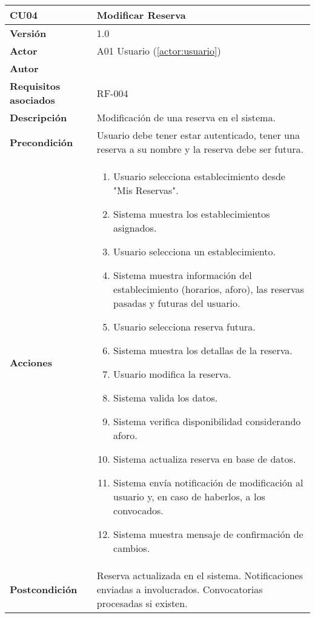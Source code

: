 \begin{table}[H]
	\centering
	\begin{tabularx}{\linewidth}{ p{} p{} }
		\toprule
		\textbf{CU04}    & \textbf{Modificar Reserva} \\
		\toprule
		\textbf{Versión}              & 1.0    \\
		\textbf{Actor}                & A01 Usuario (\ref{actor:usuario}) \\
		\textbf{Autor}                & \nombre \\
		\textbf{Requisitos asociados} & RF-004 \\
		\textbf{Descripción}          & Modificación de una reserva en el sistema. \\
		\textbf{Precondición}         & Usuario debe tener estar autenticado, tener una reserva a su nombre y la reserva debe ser futura. \\
		\textbf{Acciones}             &
		\begin{enumerate}
			\def\labelenumi{\arabic{enumi}.}
			\tightlist
			\item Usuario selecciona establecimiento desde "Mis Reservas".
            \item Sistema muestra los establecimientos asignados.
            \item Usuario selecciona un establecimiento.
            \item Sistema muestra información del establecimiento (horarios, aforo), las reservas pasadas y futuras del usuario.
            \item Usuario selecciona reserva futura.
            \item Sistema muestra los detallas de la reserva.
            \item Usuario modifica la reserva.
            \item Sistema valida los datos.
            \item Sistema verifica disponibilidad considerando aforo.
            \item Sistema actualiza reserva en base de datos.
            \item Sistema envía notificación de modificación al usuario y, en caso de haberlos, a los convocados.
            \item Sistema muestra mensaje de confirmación de cambios.
		\end{enumerate}\\
		\textbf{Postcondición}        & Reserva actualizada en el sistema. Notificaciones enviadas a involucrados. Convocatorias procesadas si existen.\\

\end{tabularx}
\end{table}
